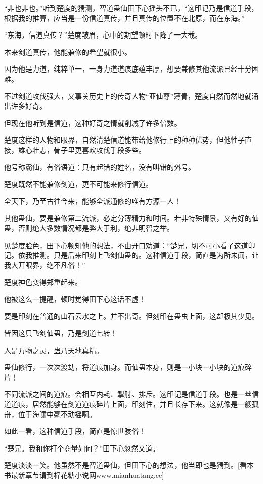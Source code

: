 
\begin{this_body}

“非也非也。”听到楚度的猜测，智道蛊仙田下心摇头不已，“这印记乃是信道手段，根据我的推算，应当是一份信道真传，并且真传的位置不在北原，而在东海。”

“东海，信道真传？”楚度皱眉，心中的期望顿时下降了一大截。

本来剑道真传，他能兼修的希望就很小。

因为他是力道，纯粹单一，一身力道道痕底蕴丰厚，想要兼修其他流派已经十分困难。

不过剑道攻伐强大，又事关历史上的传奇人物“亚仙尊”薄青，楚度自然而然地就涌出许多好奇。

但现在他听到是信道，这种好奇之情就削减了许多倍数。

楚度这样的人物和眼界，自然清楚信道能带给他修行上的种种优势，但他性子直接，雄心壮志，骨子里更喜欢攻伐手段多些。

他号称霸仙，有俗语道：只有起错的姓名，没有叫错的外号。

楚度既然不能兼修剑道，更不可能来修行信道。

全天下，乃至古往今来，能够全派通修的唯有方源一人！

其他蛊仙，要是兼修第二流派，必定分薄精力和时间。若非特殊情景，又有好的仙蛊，否则绝大多数情况都是弊大于利，绝非明智之举。

见楚度脸色，田下心顿知他的想法，不由开口劝道：“楚兄，切不可小看了这道印记。依我推测。只是后来印刻上飞剑仙蛊的。这种信道手段，简直是为所未闻，让我大开眼界，绝不凡俗！”

楚度神色变得郑重起来。

他被这么一提醒，顿时觉得田下心这话不虚！

要是印刻在普通的山石云水之上。并不出奇。但刻印在蛊虫上面，这却极其少见。

皆因这只飞剑仙蛊，乃是剑道七转！

人是万物之灵，蛊乃天地真精。

蛊仙修行，一次次渡劫，将道痕加身。而仙蛊本身，则是一小块一小块的道痕碎片！

不同流派之间的道痕。会相互内耗、掣肘、排斥。这印记是信道手段。也是一丝信道道痕，居然能够在剑道道痕碎片上面，印刻住，并且长存下来。这就像是一艘孤舟，位于海啸中毫不动摇啊。

如此一看，这种信道手段，简直是惊世骇俗！

“楚兄。我和你打个商量如何？”田下心忽然又道。

楚度淡淡一笑。他虽然不是智道蛊仙，但田下心的想法，他当即也是猜到。[看本书最新章节请到棉花糖小说网www.mianhuatang.cc]


\end{this_body}
